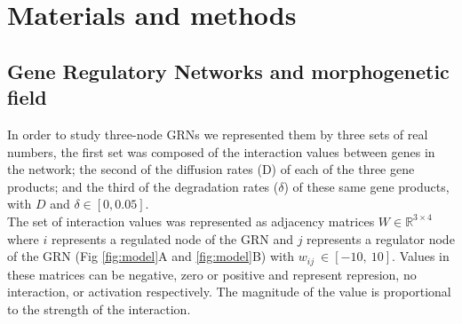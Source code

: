 \documentclass[10pt,letterpaper]{article}
\begin{document}

\section*{Materials and methods}
\subsection*{Gene Regulatory Networks and morphogenetic field}

In order to study three-node GRNs we represented them by three sets of real
numbers, the first set was composed of the interaction values
between genes in the network; the second of the diffusion rates (D) of each of
the three gene products; and the third of the degradation rates ($\delta$) of
these same gene products, with $D$ and $\delta  \in [0, 0.05]$.\\

The set of interaction values was represented as adjacency matrices $W \in
\mathbb{R}^{3\times4}$ where $i$ represents a regulated node of the GRN and $j$
represents a regulator node of the GRN (Fig \ref{fig:model}A and
\ref{fig:model}B) with $w_{\textit{ij}}~\in [-10,\ 10]$. Values in these
matrices can be negative, zero or positive and represent represion, no
interaction, or activation respectively. The magnitude of the value is
proportional to the strength of the interaction.\\
\end{document}
